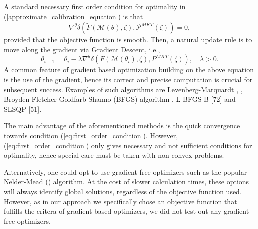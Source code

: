 \documentclass{article}
\theoremstyle{remark}
\begin{document}
A standard necessary first order condition for optimality in (\ref{approximate_calibration_equation}) is that
\begin{equation}\label{eq:first_order_condition}
\nabla^{\theta} \delta \left( \widetilde{F}(\mathcal{M}(\theta), \zeta), \mathcal{P}^{MKT} (\zeta) \right) = 0,
\end{equation}
provided that the objective function is smooth.
Then, a natural update rule is to move along the gradient via Gradient Descent, i.e.,
\begin{equation}\label{eq:gradient_descent}
\theta_{i+1} = \theta_{i} - \lambda \nabla^{\theta} \delta \left(F(\mathcal{M}(\theta_{i}), \zeta), P^{MKT}(\zeta) \right), \quad \lambda > 0.
\end{equation}
A common feature of gradient based optimization building on the above equation is the use of the gradient,
hence its correct and precise computation is crucial for subsequent success.
Examples of such algorithms are Levenberg-Marquardt \cite{Levenberg}, \cite{Marquardt},
Broyden-Fletcher-Goldfarb-Shanno (BFGS) algorithm \cite{BFGHS}, L-BFGS-B [72] and SLSQP [51].

The main advantage of the aforementioned methods is the quick convergence towards condition (\ref{eq:first_order_condition}).
However, (\ref{eq:first_order_condition}) only gives necessary and not sufficient conditions for optimality,
hence special care must be taken with non-convex problems.

Alternatively, one could opt to use gradient-free optimizers such as the popular Nelder-Mead (\cite{NelderMead}) algorithm.
At the cost of slower calculation times, these options will always identify global solutions, regardless of the objective function used.
However, as in our approach we specifically chose an objective function that fulfills the critera of gradient-based optimizers,
we did not test out any gradient-free optimizers.
\end{document}

